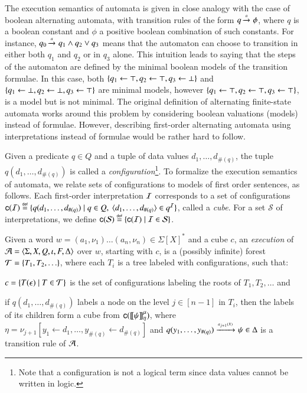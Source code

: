 The execution semantics of automata is given in close analogy with the
case of boolean alternating automata, with transition rules of the
form $q \xrightarrow{{\scriptscriptstyle a}}_{{\scriptstyle }} \phi$, where $q$ is a boolean constant and $\phi$
a positive boolean combination of such constants. For instance, $q_0
\xrightarrow{{\scriptscriptstyle a}}_{{\scriptstyle }} q_1 \wedge q_2 \vee q_3$ means that the automaton can
choose to transition in either both $q_1$ and $q_2$ or in $q_3$
alone. This intuition leads to saying that the steps of the automaton
are defined by the minimal boolean models of the transition
formulae. In this case, both $\{ q_1 \leftarrow \top, q_2 \leftarrow
  \top, q_3 \leftarrow \bot \}$ and $\{ q_1 \leftarrow \bot, q_2
  \leftarrow \bot, q_3 \leftarrow \top \}$ are minimal models, however
$\{ q_1 \leftarrow \top, q_2 \leftarrow \top, q_3 \leftarrow \top \}$,
is a model but is not minimal. The original definition of alternating
finite-state automata \cite{ChandraKozenStockmeyer81} works around
this problem by considering boolean valuations (models) instead of
formulae. However, describing first-order alternating automata using
interpretations instead of formulae would be rather hard to follow.

Given a predicate $q \in Q$ and a tuple of data values
$d_1,\ldots,d_{\#(q)}$, the tuple $q(d_1,\ldots,d_{\#(q)})$ is called
a \emph{configuration}\footnote{Note that a configuration is not a
  logical term since data values cannot be written in logic.}. To
formalize the execution semantics of automata, we relate sets of
configurations to models of first order sentences, as follows. Each
first-order interpretation $\mathcal{I}$ corresponds to a set of configurations
$\mathsf{c}({\mathcal{I}}) \stackrel{\scriptscriptstyle{\mathsf{def}}}{=} \{ q(d_1,\ldots,d_{\#(q)}) \mid q \in Q,~
  \langle d_1,\ldots,d_{\#(q)} \rangle \in q^{\mathcal{I}} \}$, called a \emph{cube}. For a
set $\mathcal{S}$ of interpretations, we define $\mathsf{c}({\mathcal{S}})
\stackrel{\scriptscriptstyle{\mathsf{def}}}{=} \{ \mathsf{c}({\mathcal{I}}) \mid \mathcal{I} \in \mathcal{S} \}$.

\begin{definition}\label{def:execution}
Given a word $w=(a_1,\nu_1) \ldots (a_n,\nu_n) \in \Sigma[X]^*$ and a cube $c$, an
\emph{execution} of $\mathcal{A}=\langle \Sigma,X,Q,\iota,F,\Delta \rangle$ over $w$, starting with $c$, is
a (possibly infinite) forest $\mathcal{T} = \{ T_1,T_2,\ldots \}$, where each
$T_i$ is a tree labeled with configurations, such that:
\begin{compactenum}
\item\label{it1:execution} $c = \{ T(\epsilon) \mid T \in \mathcal{T} \}$ is the set of
  configurations labeling the roots of $T_1,T_2,\ldots$ and
%
\item\label{it2:execution} if $q(d_1,\ldots,d_{\#(q)})$ labels a node on the level $j \in
  [n-1]$ in $T_i$, then the labels of its children form a cube from
  $\mathsf{c}({{\bf [\![} \psi {\bf ]\!]}^\mu_{\eta}})$, where $\eta = \nu_{j+1}[y_1
    \leftarrow d_1,\ldots,y_{\#(q)} \leftarrow d_{\#(q)}]$ and
  \(q(y_1,\ldots,y_{\#(q)}) \xrightarrow{{\scriptscriptstyle a_{j+1}(X)}}_{{\scriptstyle }} \psi \in \Delta\) is
  a transition rule of $\mathcal{A}$.
\end{compactenum}
\end{definition}

